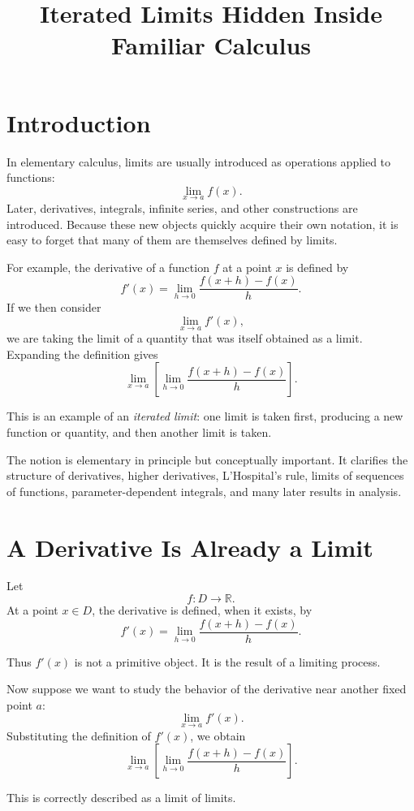 \documentclass{essay}
\title{Iterated Limits Hidden Inside Familiar Calculus}
\author{}
\date{}
\begin{document}
\maketitle

\section{Introduction}

In elementary calculus, limits are usually introduced as operations applied to functions:
\[
\lim_{x\to a} f(x).
\]
Later, derivatives, integrals, infinite series, and other constructions are introduced. Because these new objects quickly acquire their own notation, it is easy to forget that many of them are themselves defined by limits.

For example, the derivative of a function \(f\) at a point \(x\) is defined by
\[
f'(x)
=
\lim_{h\to 0}
\frac{f(x+h)-f(x)}{h}.
\]
If we then consider
\[
\lim_{x\to a} f'(x),
\]
we are taking the limit of a quantity that was itself obtained as a limit. Expanding the definition gives
\[
\lim_{x\to a}
\left[
\lim_{h\to 0}
\frac{f(x+h)-f(x)}{h}
\right].
\]

This is an example of an \emph{iterated limit}: one limit is taken first, producing a new function or quantity, and then another limit is taken.

The notion is elementary in principle but conceptually important. It clarifies the structure of derivatives, higher derivatives, L'Hospital's rule, limits of sequences of functions, parameter-dependent integrals, and many later results in analysis.

\section{A Derivative Is Already a Limit}

Let
\[
f:D\to\mathbb{R}.
\]
At a point \(x\in D\), the derivative is defined, when it exists, by
\[
f'(x)
=
\lim_{h\to 0}
\frac{f(x+h)-f(x)}{h}.
\]

Thus \(f'(x)\) is not a primitive object. It is the result of a limiting process.

Now suppose we want to study the behavior of the derivative near another fixed point \(a\):
\[
\lim_{x\to a} f'(x).
\]
Substituting the definition of \(f'(x)\), we obtain
\[
\boxed{
\lim_{x\to a}
\left[
\lim_{h\to 0}
\frac{f(x+h)-f(x)}{h}
\right].
}
\]

This is correctly described as a limit of limits.
\end{document}
